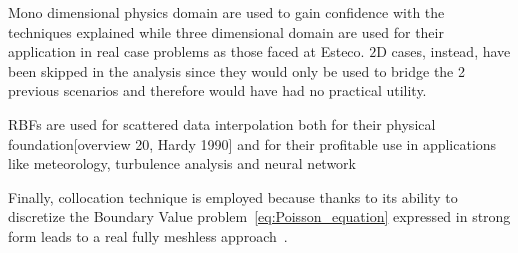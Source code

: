 Mono dimensional physics domain are used to gain confidence with the techniques explained while three dimensional  domain are used for their application in real case problems as those faced at Esteco. $2$D cases, instead, have been skipped in the analysis since they would only be used to bridge the 2 previous scenarios and therefore would have had no practical utility.

RBFs are used for scattered data interpolation both for their physical foundation[overview 20, Hardy 1990] and for their profitable use in applications like meteorology, turbulence analysis and neural network~\cite{Chen:meshless_overview_after_20_years}

Finally, collocation technique is employed because thanks to its ability to discretize the Boundary Value problem~\eqref{eq:Poisson_equation} expressed in strong form leads to a real fully meshless approach~\cite{Miotti:RBF_in_depth}.

